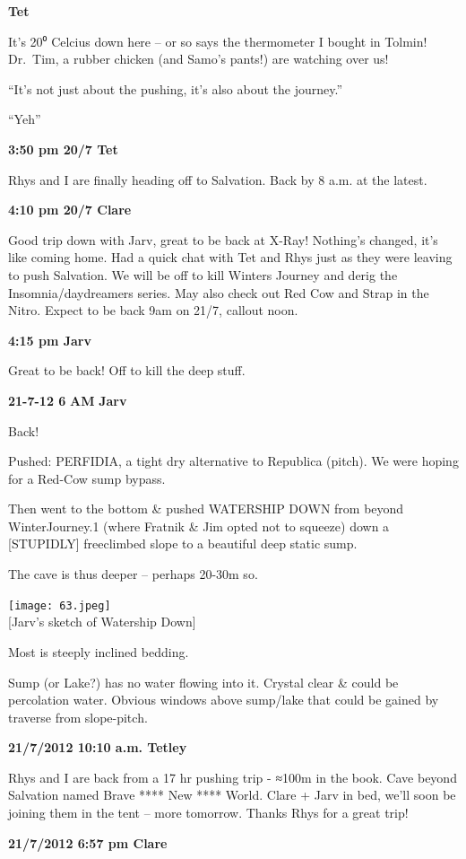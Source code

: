 \textbf{Tet}

It's 20⁰ Celcius down here -- or so says the thermometer I bought in
Tolmin! Dr.~Tim, a rubber chicken (and Samo's pants!) are watching over
us!

``It's not just about the pushing, it's also about the journey.''

``Yeh''

\textbf{3:50 pm 20/7 Tet}

Rhys and I are finally heading off to Salvation. Back by 8 a.m. at the
latest.

\textbf{4:10 pm 20/7 Clare}

Good trip down with Jarv, great to be back at X-Ray! Nothing's changed,
it's like coming home. Had a quick chat with Tet and Rhys just as they
were leaving to push Salvation. We will be off to kill Winters Journey
and derig the Insomnia/daydreamers series. May also check out Red Cow
and Strap in the Nitro. Expect to be back 9am on 21/7, callout noon.

\textbf{4:15 pm Jarv}

Great to be back! Off to kill the deep stuff.

\textbf{21-7-12 6} \textbf{AM} \textbf{Jarv}

Back!

Pushed: PERFIDIA, a tight dry alternative to Republica (pitch). We were
hoping for a Red-Cow sump bypass.

Then went to the bottom \& pushed WATERSHIP DOWN from beyond
WinterJourney.1 (where Fratnik \& Jim opted not to squeeze) down a
{[}STUPIDLY{]} freeclimbed slope to a beautiful deep static sump.

The cave is thus deeper -- perhaps 20-30m so.

\texttt{[image: 63.jpeg]}\\
{[}Jarv's sketch of Watership Down{]}

Most is steeply inclined bedding.

Sump (or Lake?) has no water flowing into it. Crystal clear \& could be
percolation water. Obvious windows above sump/lake that could be gained
by traverse from slope-pitch.

\textbf{21/7/2012 10:10 a.m. Tetley}

Rhys and I are back from a 17 hr pushing trip - ≈100m in the book. Cave
beyond Salvation named Brave **** New **** World. Clare + Jarv in bed,
we'll soon be joining them in the tent -- more tomorrow. Thanks Rhys for
a great trip!

\textbf{21/7/2012 6:57 pm Clare}

